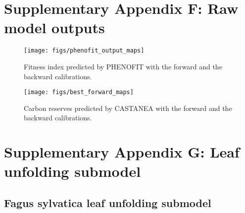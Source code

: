 \documentclass[11pt,]{article}
\begin{document}
\newpage

\hypertarget{appendixF}{%
\section{Supplementary Appendix F: Raw model outputs}\label{appendixF}}

\renewcommand*\thetable{F.\arabic{table}}
\renewcommand*\thefigure{F.\arabic{figure}}

\setcounter{figure}{0}
\setcounter{table}{0}

\renewcommand*{\thepage}{F--\arabic{page}}

\hfill \break

\begin{figure}[H]

{\centering \texttt{[image: figs/phenofit\_output\_maps]} 

}

\caption{Fitness index predicted by PHENOFIT with the forward and the backward calibrations.}\label{fig:phenofit_output_maps}
\end{figure}

\begin{figure}[H]

{\centering \texttt{[image: figs/best\_forward\_maps]} 

}

\caption{Carbon reserves predicted by CASTANEA with the forward and the backward calibrations.}\label{fig:best_forward_maps}
\end{figure}

\newpage

\hypertarget{appendixG}{%
\section{Supplementary Appendix G: Leaf unfolding
submodel}\label{appendixG}}

\renewcommand*\thetable{G.\arabic{table}}
\renewcommand*\thefigure{G.\arabic{figure}}

\setcounter{figure}{0}
\setcounter{table}{0}

\renewcommand*{\thepage}{G--\arabic{page}}

\hfill \break

\hypertarget{fagus-sylvatica-leaf-unfolding-submodel}{%
\subsection{Fagus sylvatica leaf unfolding
submodel}\label{fagus-sylvatica-leaf-unfolding-submodel}}
\end{document}
